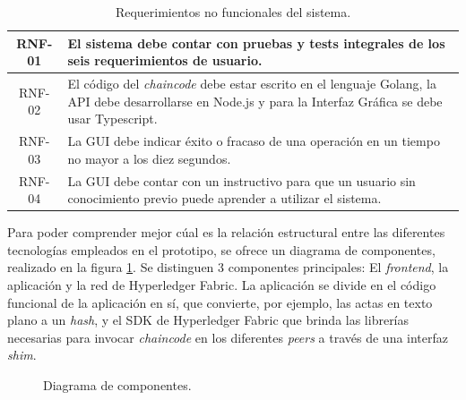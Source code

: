 \begin{table}[h]
    \begin{tabularx}{\textwidth}{|c|X|}
    \hline
    RNF-01 & El sistema debe contar con pruebas y tests integrales de los seis requerimientos de usuario.\\
    \hline
    RNF-02 & El código del \textit{chaincode} debe estar escrito en el lenguaje Golang, la API debe desarrollarse en Node.js y para la Interfaz Gráfica se debe usar Typescript.\\
    \hline
    RNF-03 & La GUI debe indicar éxito o fracaso de una operación en un tiempo no mayor a los diez segundos.\\
    \hline
    RNF-04 & La GUI debe contar con un instructivo para que un usuario sin conocimiento previo puede aprender a utilizar el sistema.\\
    \hline
    \end{tabularx}
    \caption{Requerimientos no funcionales del sistema.}
    \label{table:req_nofunc}
\end{table}

Para poder comprender mejor cúal es la relación estructural entre las diferentes tecnologías empleados en el prototipo, se ofrece un diagrama de componentes, realizado en la figura \ref{fig:components}. Se distinguen 3 componentes principales: El \textit{frontend}, la aplicación y la red de Hyperledger Fabric. La aplicación se divide en el código funcional de la aplicación en sí, que convierte, por ejemplo, las actas en texto plano a un \textit{hash}, y el SDK de Hyperledger Fabric que brinda las librerías necesarias para invocar \textit{chaincode} en los diferentes \textit{peers} a través de una interfaz \textit{shim}.

\begin{figure}[H]
    \caption{Diagrama de componentes.}
    \label{fig:components}
\end{figure}


